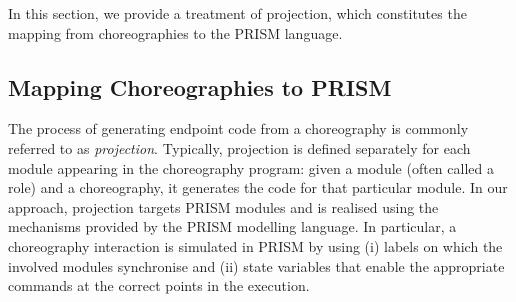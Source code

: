 In this section, we provide a treatment of projection, which
constitutes the mapping from choreographies to the PRISM language.

\subsection{Mapping Choreographies to PRISM} 
The process of generating endpoint code from a choreography is
commonly referred to as \emph{projection}. Typically, projection is
defined separately for each module appearing in the choreography
program: given a module (often called a role) and a choreography, it
generates the code for that particular module.
In our approach, projection targets PRISM modules and is realised
using the mechanisms provided by the PRISM modelling language. In
particular, a choreography interaction is simulated in PRISM by using
(i) labels on which the involved modules synchronise and (ii) state
variables that enable the appropriate commands at the correct points
in the execution.

